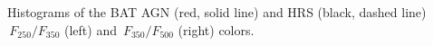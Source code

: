 \label{fig:hist_250_350_color} Histograms of the BAT AGN (red, solid line) and HRS (black, dashed line) $\,F_{250}/F_{350}$ (left) and  $\,F_{350}/F_{500}$ (right) colors.  